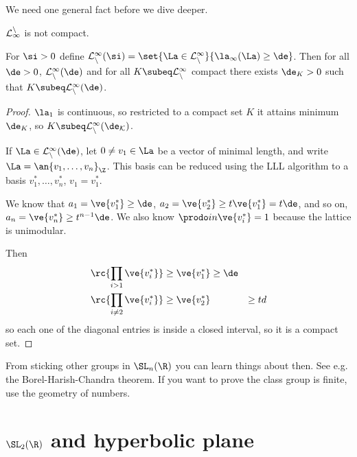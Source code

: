 

We need one general fact before we dive deeper.

$\cal L_1^n$ is not compact. 

\begin{lem}
For $\si>0$ define $\cal L_n^1(\si)= \set{\La\in \cal L_n^1}{\la_1(\La) \ge \de}$. Then for all $\de>0$, $\cal L_n^1(\de)$ and for all $K\subeq \cal L_n^1$ compact there exists $\de_K>0$ such that $K\subeq \cal L_n^1(\de)$. 
\end{lem}
\begin{proof}
$\la_1$ is continuous, so restricted to a compact set $K$ it attains minimum $\de_K$, so $K\subeq \cal L_n^1(\de_K)$.

If $\La\in \cal L_n^1(\de)$, let $0\ne v_1\in \La$ be a vector of minimal length, and write $\La = \an{v_1,\ldots, v_n}_\Z$. %
This basis can be reduced using the LLL algorithm to a basis $v_1^*,\ldots, v_n^*$, $v_1=v_1^*$. 

We know that $a_1=\ve{v_1^*}\ge \de$, $a_2=\ve{v_2^*}\ge t \ve{v_1^*} = t\de$, and so on, $a_n=\ve{v_n^*}\ge t^{n-1}\de$.  %
We also know $\prodo in \ve{v_i^*}=1$ because the lattice is unimodular.

Then 
\begin{align}
\rc{\prod_{i>1} \ve{v_i^*}}&\ge \ve{v_1^*}\ge \de\\
\rc{\prod_{i\ne 2} \ve{v_i^*}}&\ge 
\ve{v_2^*} &\ge td
\end{align}
so each one of the diagonal entries is inside a closed interval, so it is a compact set.
\end{proof}
From sticking other groups in $\SL_n(\R)$ you can learn things about then. See e.g. the Borel-Harish-Chandra theorem. If you want to prove the class group is finite, use the geometry of numbers.

\section{$\SL_2(\R)$ and hyperbolic plane}

